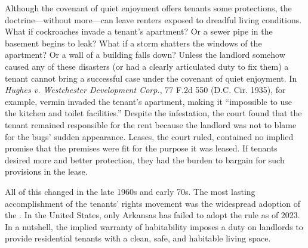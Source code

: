 Although the covenant of quiet enjoyment offers tenants some protections, the
doctrine---without more---can leave renters exposed to dreadful living
conditions.  What if cockroaches invade a tenant's apartment? Or a sewer pipe
in the basement begins to leak?  What if a storm shatters the windows of the
apartment? Or a wall of a building falls down?  Unless the landlord somehow
caused any of these disasters (or had a clearly articulated duty to fix them) a
tenant cannot bring a successful case under the covenant of quiet enjoyment. 
In \textit{Hughes v. Westchester Development Corp.}, 77 F.2d 550 (D.C. Cir.
1935), for example, vermin invaded the tenant's apartment, making it
``impossible to use the kitchen and toilet facilities.'' Despite the
infestation, the court found that the tenant remained responsible for the rent
because the landlord was not to blame for the bugs' sudden appearance.  Leases,
the court ruled, contained no implied promise that the premises were fit for the
purpose it was leased.  If tenants desired more and better protection, they had
the burden to bargain for such provisions in the lease. 

All of this changed in the late 1960s and early 70s.  The most lasting
accomplishment of the tenants' rights movement was the widespread adoption of
the . In the United States, only
Arkansas has failed to adopt the rule as of 2023.  In a nutshell, the implied
warranty of
habitability imposes a duty on landlords to provide residential tenants with a
clean, safe, and habitable living space. 

